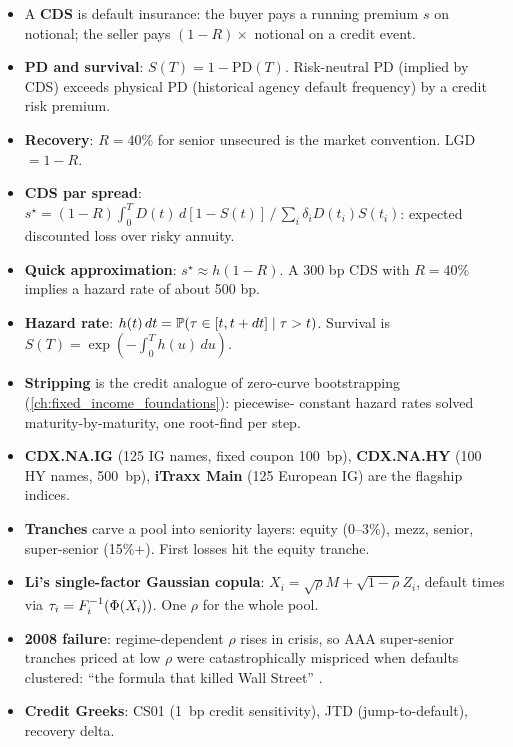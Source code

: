 \begin{itemize}
  \item A \textbf{CDS} is default insurance: the buyer pays a
    running premium $s$ on notional; the seller pays $(1-R) \times$
    notional on a credit event.
  \item \textbf{PD and survival}: $S(T) = 1 - \mathrm{PD}(T)$.
    Risk-neutral PD (implied by CDS) exceeds physical PD (historical
    agency default frequency) by a credit risk premium.
  \item \textbf{Recovery}: $R = 40\%$ for senior unsecured is the
    market convention.  LGD $= 1 - R$.
  \item \textbf{CDS par spread}:
    $s^\star = (1-R) \int_0^T D(t)\, d[1-S(t)] \,/\,
      \sum_i \delta_i D(t_i) S(t_i)$: expected discounted loss
    over risky annuity.
  \item \textbf{Quick approximation}: $s^\star \approx h (1-R)$.
    A 300 bp CDS with $R = 40\%$ implies a hazard rate of about
    500 bp.
  \item \textbf{Hazard rate}: $h(t)\,dt =
    \mathbb{P}(\tau \in [t, t+dt] \mid \tau > t)$.  Survival is
    $S(T) = \exp\!\left(-\int_0^T h(u)\, du\right)$.
  \item \textbf{Stripping} is the credit analogue of zero-curve
    bootstrapping (\cref{ch:fixed_income_foundations}): piecewise-
    constant hazard rates solved maturity-by-maturity, one root-find
    per step.
  \item \textbf{CDX.NA.IG} (125 IG names, fixed coupon 100~bp),
    \textbf{CDX.NA.HY} (100 HY names, 500~bp), \textbf{iTraxx Main}
    (125 European IG) are the flagship indices.
  \item \textbf{Tranches} carve a pool into seniority layers:
    equity (0--3\%), mezz, senior, super-senior (15\%+).  First
    losses hit the equity tranche.
  \item \textbf{Li's single-factor Gaussian copula}:
    $X_i = \sqrt{\rho} M + \sqrt{1-\rho} Z_i$, default times via
    $\tau_i = F_i^{-1}(\Phi(X_i))$.  One $\rho$ for the whole
    pool.
  \item \textbf{2008 failure}: regime-dependent $\rho$ rises in
    crisis, so AAA super-senior tranches priced at low $\rho$ were
    catastrophically mispriced when defaults clustered: ``the
    formula that killed Wall Street'' \citep{salmon2009formula}.
  \item \textbf{Credit Greeks}: CS01 (1~bp credit sensitivity),
    JTD (jump-to-default), recovery delta.
\end{itemize}
